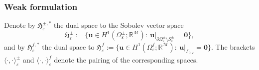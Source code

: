 \documentclass[reqno]{amsart}            %
\numberwithin{equation}{section}
\begin{document}
	\subsubsection*{Weak formulation}	
		Denote by $\boldsymbol{\mathfrak{H}}^{\pm, *}_\varepsilon$ the dual space to the Sobolev vector space 
	$$
	\boldsymbol{\mathfrak{H}}^{\pm}_\varepsilon := \big\{ \mathbf{u}\in H^1(\Omega^\pm_\varepsilon; \mathbb{R}^\mathcal{M})\colon \ \mathbf{u}\big|_{\partial\Omega^\pm_\varepsilon \setminus S^\pm_\varepsilon} = \mathbf{0} \big\},
	$$ 
	and by 
	$\boldsymbol{\mathfrak{H}}^{f, *}_\varepsilon$ the dual space to  
	$\boldsymbol{\mathfrak{H}}^{f}_\varepsilon := \big\{ \mathbf{u}\in H^1(\Omega^f_\varepsilon; \mathbb{R}^\mathcal{M})\colon \ \mathbf{u}\big|_{\Gamma_{0,\varepsilon}} = \mathbf{0} \big\}.$ The brackets $\langle\cdot,\cdot\rangle^\pm_\varepsilon$ and $\langle\cdot,\cdot\rangle^f_\varepsilon$ denote the pairing of the corresponding spaces.
	
\end{document}
